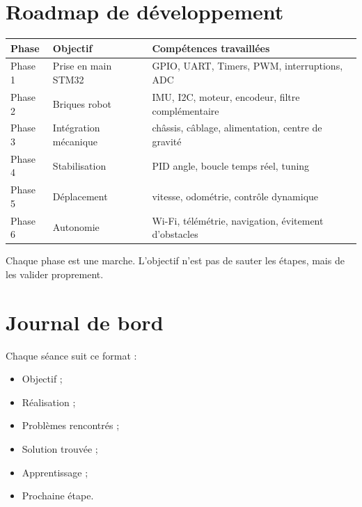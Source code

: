 \documentclass[11pt,a4paper]{article}
\begin{document}
	\section{Roadmap de développement}
	
	\begin{longtable}{p{3cm}p{5.5cm}p{5.5cm}}
		\toprule
		\textbf{Phase} & \textbf{Objectif} & \textbf{Compétences travaillées} \\
		\midrule
		Phase 1 & Prise en main STM32 & GPIO, UART, Timers, PWM, interruptions, ADC \\
		Phase 2 & Briques robot & IMU, I2C, moteur, encodeur, filtre complémentaire \\
		Phase 3 & Intégration mécanique & châssis, câblage, alimentation, centre de gravité \\
		Phase 4 & Stabilisation & PID angle, boucle temps réel, tuning \\
		Phase 5 & Déplacement & vitesse, odométrie, contrôle dynamique \\
		Phase 6 & Autonomie & Wi-Fi, télémétrie, navigation, évitement d'obstacles \\
		\bottomrule
	\end{longtable}
	
	\begin{motivation}
		Chaque phase est une marche. L'objectif n'est pas de sauter les étapes, mais de les valider proprement.
	\end{motivation}
	
	\section{Journal de bord}
	
	Chaque séance suit ce format :
	
	\begin{itemize}
		\item Objectif ;
		\item Réalisation ;
		\item Problèmes rencontrés ;
		\item Solution trouvée ;
		\item Apprentissage ;
		\item Prochaine étape.
	\end{itemize}
	
	\newpage
	
\end{document}
